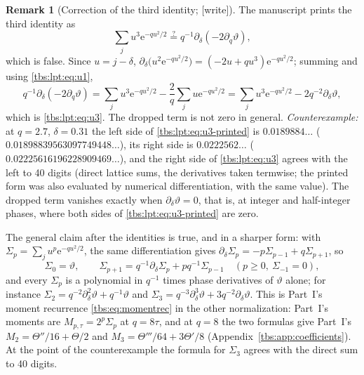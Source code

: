 \documentclass[11pt,a4paper]{article}
\numberwithin{equation}{section}
\theoremstyle{definition}
\newtheorem{remark}[theorem]{Remark}
\newcommand{\ee}{\mathrm e}
\begin{document}
\begin{remark}[Correction of the third identity; {[write]}]\label{tbs:lpt:rem:u3}
The manuscript prints the third identity as
\begin{equation}\label{tbs:lpt:eq:u3-printed}
 \sum_j u^3\ee^{-qu^2/2}\overset{?}{=}q^{-1}\partial_\delta(-2\partial_q\vartheta),
\end{equation}
which is false. Since $u=j-\delta$,
$\partial_\delta\bigl(u^2\ee^{-qu^2/2}\bigr)=(-2u+qu^3)\ee^{-qu^2/2}$;
summing and using \eqref{tbs:lpt:eq:u1},
\[
 q^{-1}\partial_\delta(-2\partial_q\vartheta)
 =\sum_j u^3\ee^{-qu^2/2}-\frac2q\sum_ju\ee^{-qu^2/2}
 =\sum_j u^3\ee^{-qu^2/2}-2q^{-2}\partial_\delta\vartheta,
\]
which is \eqref{tbs:lpt:eq:u3}. The dropped term is not zero in general.
\emph{Counterexample:} at $q=2.7$, $\delta=0.31$ the left side of
\eqref{tbs:lpt:eq:u3-printed} is $0.0189884\ldots$
($0.01898839563097749448\ldots$), its right side is $0.0222562\ldots$
($0.02225616196228909469\ldots$), and the right side of
\eqref{tbs:lpt:eq:u3} agrees with the left to 40 digits (direct lattice
sums, the derivatives taken termwise; the printed form was also evaluated
by numerical differentiation, with the same value). The dropped term
vanishes exactly when $\partial_\delta\vartheta=0$, that is, at integer
and half-integer phases, where both sides of \eqref{tbs:lpt:eq:u3-printed}
are zero.

The general claim after the identities is true, and in a sharper form:
with $\Sigma_p=\sum_ju^p\ee^{-qu^2/2}$, the same differentiation gives
$\partial_\delta\Sigma_p=-p\Sigma_{p-1}+q\Sigma_{p+1}$, so
\begin{equation}\label{tbs:lpt:eq:moment-rec}
 \Sigma_0=\vartheta,\qquad
 \Sigma_{p+1}=q^{-1}\partial_\delta\Sigma_p+pq^{-1}\Sigma_{p-1}
 \quad(p\ge0,\ \Sigma_{-1}=0),
\end{equation}
and every $\Sigma_p$ is a polynomial in $q^{-1}$ times phase derivatives
of $\vartheta$ alone; for instance
$\Sigma_2=q^{-2}\partial_\delta^2\vartheta+q^{-1}\vartheta$ and
$\Sigma_3=q^{-3}\partial_\delta^3\vartheta+3q^{-2}\partial_\delta\vartheta$.
This is Part~I's moment recurrence \eqref{tbs:eq:momentrec} in the other
normalization: Part~I's moments are $M_{p,\tau}=2^p\Sigma_p$ at $q=8\tau$,
and at $q=8$ the two formulas give Part~I's
$M_2=\Theta''/16+\Theta/2$ and $M_3=\Theta'''/64+3\Theta'/8$
(Appendix~\ref{tbs:app:coefficients}). At the point of the counterexample
the formula for $\Sigma_3$ agrees with the direct sum to 40 digits.
\end{remark}
\end{document}
